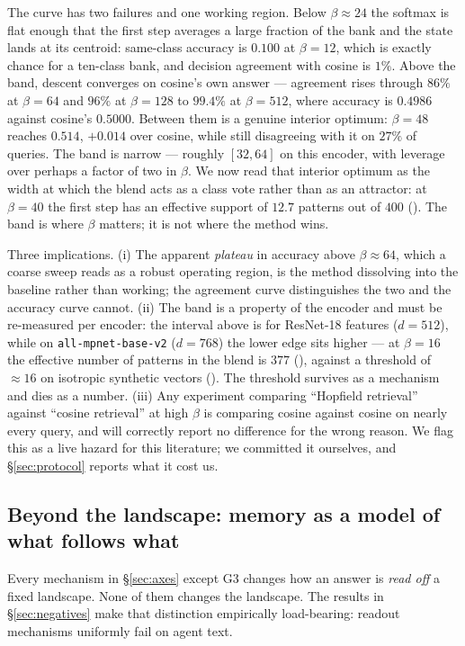 The curve has two failures and one working region. Below $\beta \approx 24$ the softmax is
flat enough that the first step averages a large fraction of the bank and the state lands at
its centroid: same-class accuracy is $0.100$ at $\beta{=}12$, which is exactly chance for a ten-class
bank, and decision agreement with cosine is $1\%$. Above the band, descent converges on
cosine's own answer --- agreement rises through $86\%$ at $\beta{=}64$ and $96\%$ at
$\beta{=}128$ to $\mathbf{99.4\%}$ at $\beta{=}512$, where accuracy is $0.4986$ against
cosine's $0.5000$. Between them is a genuine interior optimum: $\beta{=}48$ reaches $0.514$,
$+0.014$ over cosine, while still disagreeing with it on $27\%$ of queries. The band is
narrow --- roughly $[32, 64]$ on this encoder, with leverage over perhaps a factor of two in
$\beta$. We now read that interior optimum as the width at which the blend acts as a class
vote rather than as an attractor: at $\beta{=}40$ the first step has an effective support of
$12.7$ patterns out of $400$ (). The band is where $\beta$ matters; it is not
where the method wins.

Three implications. (i) The apparent \emph{plateau} in accuracy above $\beta \approx 64$,
which a coarse sweep reads as a robust operating region, is the method dissolving into the
baseline rather than working; the agreement curve distinguishes the two and the accuracy
curve cannot. (ii) The band is a property of the encoder and must be re-measured per
encoder: the interval above is for ResNet-18 features ($d{=}512$), while on
\texttt{all-mpnet-base-v2} ($d{=}768$) the lower edge sits higher --- at $\beta{=}16$ the
effective number of patterns in the blend is $377$ (), against a threshold of
$\approx 16$ on isotropic synthetic vectors (). The threshold survives as a
mechanism and dies as a number. (iii) Any experiment comparing ``Hopfield retrieval''
against ``cosine retrieval'' at high $\beta$ is comparing cosine against cosine on nearly
every query, and will correctly report no difference for the wrong reason. We flag this as
a live hazard for this literature; we committed it ourselves, and \S\ref{sec:protocol}
reports what it cost us.

\subsection{Beyond the landscape: memory as a model of what follows what}
\label{sec:worldmodel}

Every mechanism in \S\ref{sec:axes} except G3 changes how an answer is \emph{read off} a
fixed landscape. None of them changes the landscape. The results in \S\ref{sec:negatives}
make that distinction empirically load-bearing: readout mechanisms uniformly fail on agent
text.

